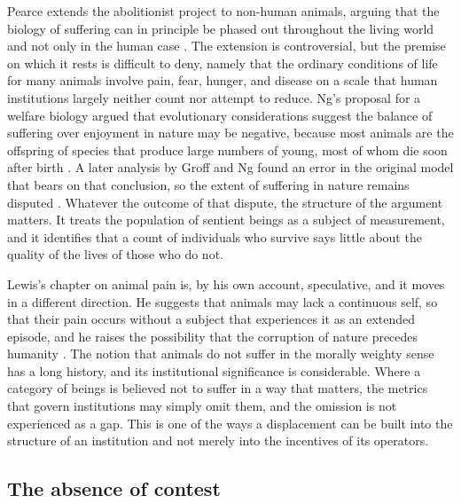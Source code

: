 \documentclass[11pt]{article}
\begin{document}
Pearce extends the abolitionist project to non-human animals, arguing that the biology of suffering can in principle be phased out throughout the living world and not only in the human case \citep{pearce1995,pearce2007}. The extension is controversial, but the premise on which it rests is difficult to deny, namely that the ordinary conditions of life for many animals involve pain, fear, hunger, and disease on a scale that human institutions largely neither count nor attempt to reduce. Ng's proposal for a welfare biology argued that evolutionary considerations suggest the balance of suffering over enjoyment in nature may be negative, because most animals are the offspring of species that produce large numbers of young, most of whom die soon after birth \citep{ng1995}. A later analysis by Groff and Ng found an error in the original model that bears on that conclusion, so the extent of suffering in nature remains disputed \citep{groff2019}. Whatever the outcome of that dispute, the structure of the argument matters. It treats the population of sentient beings as a subject of measurement, and it identifies that a count of individuals who survive says little about the quality of the lives of those who do not.

Lewis's chapter on animal pain is, by his own account, speculative, and it moves in a different direction. He suggests that animals may lack a continuous self, so that their pain occurs without a subject that experiences it as an extended episode, and he raises the possibility that the corruption of nature precedes humanity \citep[chap.~9]{lewis1940}. The notion that animals do not suffer in the morally weighty sense has a long history, and its institutional significance is considerable. Where a category of beings is believed not to suffer in a way that matters, the metrics that govern institutions may simply omit them, and the omission is not experienced as a gap. This is one of the ways a displacement can be built into the structure of an institution and not merely into the incentives of its operators.

\subsection{The absence of contest}
\end{document}
